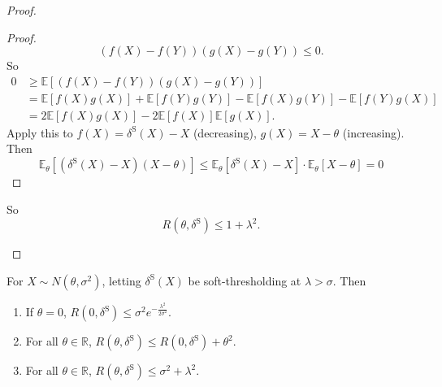 \documentclass[a4paper]{article}
\begin{document}
\begin{proof}
\begin{enumerate}
\begin{proof}
			\begin{equation*}
				(f(X)-f(Y))(g(X)-g(Y)) \leq 0.
			\end{equation*}
			So
			\begin{equation*}
				\begin{aligned}
					0 &\geq \mathbb{E}[(f(X)-f(Y))(g(X)-g(Y))] \\
					  &= \mathbb{E}[f(X)g(X)] + \mathbb{E}[f(Y)g(Y)] - \mathbb{E}[f(X)g(Y)] - \mathbb{E}[f(Y)g(X)] \\
					  &= 2\mathbb{E}[f(X)g(X)] - 2\mathbb{E}[f(X)]\mathbb{E}[g(X)].
				\end{aligned}
			\end{equation*}
			Apply this to $f(X) = \delta^{\text{S}}(X) - X$ (decreasing), $g(X) = X - \theta$ (increasing).
			Then
			\begin{equation*}
				\mathbb{E}_\theta[(\delta^{\text{S}}(X) - X)(X - \theta)] \leq \mathbb{E}_\theta[\delta^{\text{S}}(X) - X] \cdot \mathbb{E}_\theta[X - \theta] = 0
			\end{equation*}
		\end{proof}
		So
		\begin{equation}
			R(\theta,\delta^{\text{S}}) \leq 1 + \lambda^2.
		\end{equation}
	\end{enumerate}
\end{proof}

\begin{cor}
	For $X \sim N(\theta,\sigma^2)$, letting $\delta^{\text{S}}(X)$ be soft-thresholding at $\lambda > \sigma$. Then
	\begin{enumerate}
		\item If $\theta = 0$, $R(0,\delta^{\text{S}}) \leq \sigma^2e^{-\frac{\lambda^2}{2\sigma^2}}$.
		\item For all $\theta \in \mathbb{R}$, $R(\theta,\delta^{\text{S}}) \leq R(0,\delta^{\text{S}}) + \theta^2$.
		\item For all $\theta \in \mathbb{R}$, $R(\theta,\delta^{\text{S}}) \leq \sigma^2 + \lambda^2$.
	\end{enumerate}
\end{cor}
\end{document}
